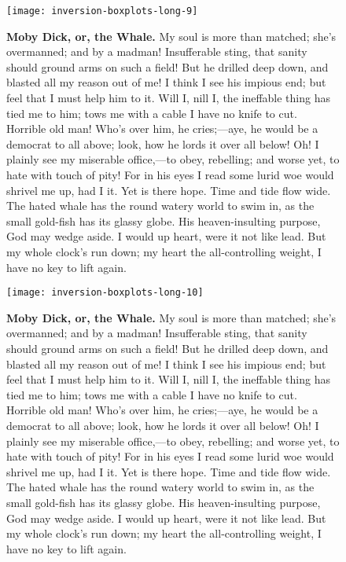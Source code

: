 \documentclass{article}
\begin{document}
\begin{figure}[!htp]
  \begin{center}
      \texttt{[image: inversion-boxplots-long-9]}
    \caption{
        \textbf{Moby Dick, or, the Whale.}
My soul is more than matched; she's overmanned; and by a madman! Insufferable sting, that sanity should ground arms on such a field! But he drilled deep down, and blasted all my reason out of me! I think I see his impious end; but feel that I must help him to it. Will I, nill I, the ineffable thing has tied me to him; tows me with a cable I have no knife to cut. Horrible old man! Who's over him, he cries;—aye, he would be a democrat to all above; look, how he lords it over all below! Oh! I plainly see my miserable office,—to obey, rebelling; and worse yet, to hate with touch of pity! For in his eyes I read some lurid woe would shrivel me up, had I it. Yet is there hope. Time and tide flow wide. The hated whale has the round watery world to swim in, as the small gold-fish has its glassy globe. His heaven-insulting purpose, God may wedge aside. I would up heart, were it not like lead. But my whole clock's run down; my heart the all-controlling weight, I have no key to lift again. 
    }
  \end{center}
\end{figure}

\begin{figure}[!htp]
  \begin{center}
      \texttt{[image: inversion-boxplots-long-10]}
    \caption{
        \textbf{Moby Dick, or, the Whale.}
My soul is more than matched; she's overmanned; and by a madman! Insufferable sting, that sanity should ground arms on such a field! But he drilled deep down, and blasted all my reason out of me! I think I see his impious end; but feel that I must help him to it. Will I, nill I, the ineffable thing has tied me to him; tows me with a cable I have no knife to cut. Horrible old man! Who's over him, he cries;—aye, he would be a democrat to all above; look, how he lords it over all below! Oh! I plainly see my miserable office,—to obey, rebelling; and worse yet, to hate with touch of pity! For in his eyes I read some lurid woe would shrivel me up, had I it. Yet is there hope. Time and tide flow wide. The hated whale has the round watery world to swim in, as the small gold-fish has its glassy globe. His heaven-insulting purpose, God may wedge aside. I would up heart, were it not like lead. But my whole clock's run down; my heart the all-controlling weight, I have no key to lift again. 
    }
  \end{center}
\end{figure}
\end{document}
